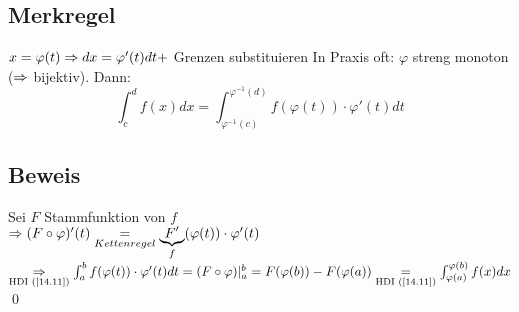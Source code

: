 \fancyhead[R]{}
\subsection*{Merkregel}
$x=\varphi(t) \Rightarrow dx = \varphi'(t) dt +$ Grenzen substituieren\nl
In Praxis oft: $\varphi$ streng monoton ($\Rightarrow$ bijektiv). Dann:
$$\int_c^d f(x) dx = \int_{\varphi^{-1}(c)}^{\varphi^{-1}(d)} f(\varphi(t)) \cdot \varphi'(t) dt$$

\subsection*{Beweis}
Sei $F$ Stammfunktion von $f$\\
$\Rightarrow (F \circ \varphi)'(t) \underset{Kettenregel}{=} \underbrace{F'}_{f}(\varphi(t)) \cdot \varphi'(t)$\\
$\underset{\text{HDI (\ref{14.11})}}{\Rightarrow} \int_a^b f(\varphi(t)) \cdot \varphi'(t) dt = (F \circ \varphi) \arrowvert_a^b = F(\varphi(b)) - F(\varphi(a)) \underset{\text{HDI (\ref{14.11})}}{=} \int_{\varphi(a)}^{\varphi(b)} f(x) dx$ \qed


